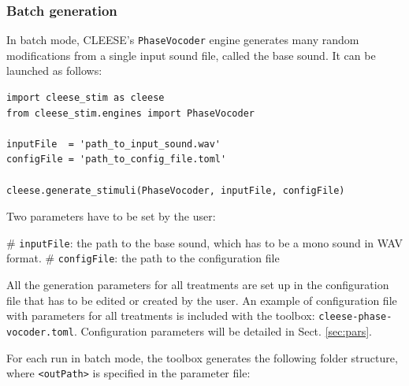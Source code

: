 \documentclass[oneside,10pt]{article}
\begin{document}
\subsubsection{Batch generation}

In batch mode, CLEESE's \texttt{PhaseVocoder} engine generates many random
modifications from a single input sound file, called the base sound. It can be
launched as follows:

\vspace{8pt}
\begin{verbatim}
import cleese_stim as cleese
from cleese_stim.engines import PhaseVocoder

inputFile  = 'path_to_input_sound.wav'
configFile = 'path_to_config_file.toml'

cleese.generate_stimuli(PhaseVocoder, inputFile, configFile)
\end{verbatim}
\vspace{8pt}


Two parameters have to be set by the user:

\vspace{5pt}
\begin{easylist}[itemize]
# \texttt{inputFile}: the path to the base sound, which has to be a mono sound in WAV format.
# \texttt{configFile}: the path to the configuration file
\end{easylist}
\vspace{8pt}

All the generation parameters for all treatments are set up in the
configuration file that has to be edited or created by the user. An example of
configuration file with parameters for all treatments is included with the
toolbox: \texttt{cleese-phase-vocoder.toml}. Configuration parameters will be
detailed in Sect. \ref{sec:pars}.

For each run in batch mode, the toolbox generates the following folder
structure, where \texttt{<outPath>} is specified in the parameter file:
\end{document}
